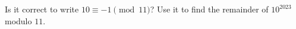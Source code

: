 Is it correct to write $10\equiv-1\pmod{11}$? Use it to find the remainder of $10^{2023}$ modulo $11$.
